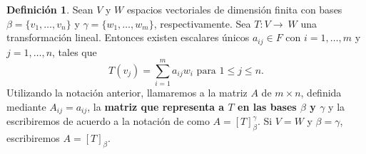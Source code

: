 \documentclass[12pt]{book}
\theoremstyle{definition}
\newtheorem{definition}[theorem]{Definición}
\newcounter{in}
\newcounter{ini}
\begin{document}
\begin{definition}
  \label{matr-rep-T}
  Sean $V$ y $W$ espacios vectoriales de dimensión finita con bases $\beta=\{v_{1},\ldots,v_{n}\}$ y
  $\gamma=\{w_{1},\ldots,w_{m}\}$, respectivamente. Sea $T:V\rightarrow~W$ una
  transformación lineal. Entonces existen escalares únicos $a_{ij}\in F$
  con $i=1,\ldots,m$ y $j=1,\ldots,n$, tales que
  \begin{equation*}
    T(v_{j})=\sum_{i=1}^{m}a_{ij}w_{i} \mbox{ para } 1\leq j\leq n. 
  \end{equation*}
  Utilizando la notación anterior, llamaremos a la matriz $A$ de
  $m\times n$, definida mediante $A_{ij}=a_{ij}$, la \textbf{matriz que representa a $T$
  en las bases $\beta$ y $\gamma$} y la escribiremos de acuerdo a la
  notación de \cite{friedberg1982algebra} como
  $A=[T]^{\gamma}_{\beta}$. Si $V=W$ y $\beta=\gamma$, escribiremos
  $A=[T]_{\beta}$.
\end{definition}
\end{document}
